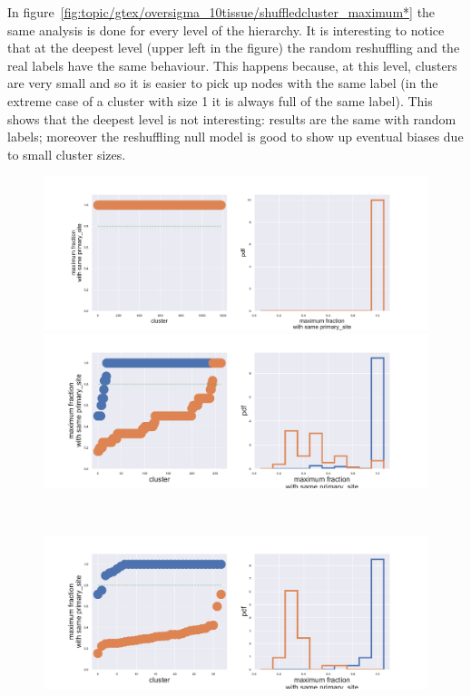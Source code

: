 \FloatBarrier
In figure~\ref{fig:topic/gtex/oversigma_10tissue/shuffledcluster_maximum*} the same analysis is done for every level of the hierarchy. It is interesting to notice that at the deepest level (upper left in the figure) the random reshuffling and the real labels have the same behaviour. This happens because, at this level, clusters are very small and so it is easier to pick up nodes with the same label (in the extreme case of a cluster with size 1 it is always full of the same label). This shows that the deepest level is not interesting: results are the same with random labels; moreover the reshuffling null model is good to show up eventual biases due to small cluster sizes.
\begin{figure}[htb!]
    \centering
    \begin{minipage}{0.45\textwidth}
    \includegraphics[width=0.85\linewidth]{pictures/topic/gtex/oversigma_10tissue/shuffledcluster_maximum_l0_primary_site.pdf}
    \end{minipage}
    \hspace{3mm}
    \begin{minipage}{0.45\textwidth}
    \includegraphics[width=0.85\linewidth]{pictures/topic/gtex/oversigma_10tissue/shuffledcluster_maximum_l1_primary_site.pdf}
    \end{minipage}
    \\
    \begin{minipage}{0.45\textwidth}
    \includegraphics[width=0.85\linewidth]{pictures/topic/gtex/oversigma_10tissue/shuffledcluster_maximum_l2_primary_site.pdf}

\end{minipage}
\end{figure}
